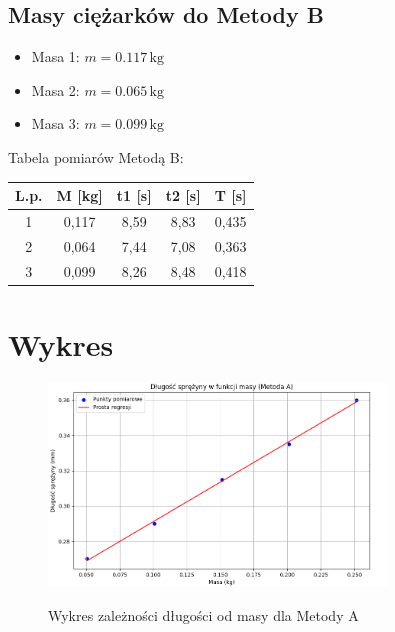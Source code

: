\documentclass[12pt]{article}
\begin{document}
\subsection*{Masy ciężarków do Metody B}
\begin{itemize}
    \item Masa 1: \( m = 0.117 \, \text{kg} \)
    \item Masa 2: \( m = 0.065 \, \text{kg} \)
    \item Masa 3: \( m = 0.099 \, \text{kg} \)
\end{itemize}


Tabela pomiarów Metodą B:
\begin{center}
    \begin{tabular}{|c|c|c|c|c|}
    \hline
    L.p. & M [kg] & t1 [s] & t2 [s] & T [s]  \\
    \hline
    1 & 0{,}117 & 8{,}59 & 8{,}83 & 0{,}435  \\
    2 & 0{,}064 & 7{,}44 & 7{,}08 & 0{,}363  \\
    3 & 0{,}099 & 8{,}26 & 8{,}48 & 0{,}418  \\
    \hline
    \end{tabular}
    \end{center}
    
\section*{Wykres}

\begin{figure}[H]
    \centering
    \includegraphics[width=0.8\textwidth]{MetodaA.png}
    \label{fig:wykres}
    \caption{Wykres zależności długości od masy dla Metody A}
\end{figure}
\FloatBarrier
\end{document}
